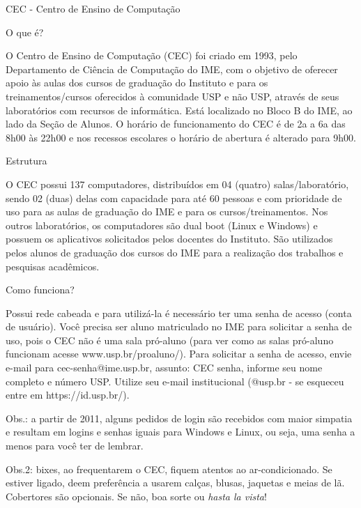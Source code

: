 \begin{secao}{CEC - Centro de Ensino de Computação}

\begin{subsecao}{O que é?}

O Centro de Ensino de Computação (CEC) foi criado em 1993, pelo
Departamento de Ciência de Computação do IME, com o objetivo de
oferecer apoio às aulas dos cursos de graduação do Instituto e para os
treinamentos/cursos oferecidos à comunidade USP e não USP, através de
seus laboratórios com recursos de informática.
Está localizado no Bloco B do IME, ao lado da Seção de Alunos. O horário
de funcionamento do CEC é de 2a a 6a das 8h00 às 22h00 e nos recessos
escolares o horário de abertura é alterado para 9h00.

\end{subsecao}

\begin{subsecao}{Estrutura}

O CEC possui 137 computadores, distribuídos em 04 (quatro)
salas/laboratório, sendo 02 (duas) delas com capacidade para até 60
pessoas e com prioridade de uso para as aulas de graduação do IME e
para os cursos/treinamentos.
Nos outros laboratórios, os computadores são dual boot (Linux e Windows) e
possuem os aplicativos solicitados pelos docentes do Instituto. São
utilizados pelos alunos de graduação dos cursos do IME para a realização
dos trabalhos e pesquisas acadêmicos.

\end{subsecao}

\begin{subsecao}{Como funciona?}

Possui rede cabeada e para utilizá-la é necessário ter uma senha de
acesso (conta de usuário). Você precisa ser aluno matriculado no IME para
solicitar a senha de uso, pois o CEC não é uma sala pró-aluno (para ver
como as salas pró-aluno funcionam acesse www.usp.br/proaluno/). 
Para solicitar a senha de acesso, envie e-mail para cec-senha@ime.usp.br,
assunto: CEC senha, informe seu nome completo e número USP. Utilize
seu e-mail institucional (@usp.br - se esqueceu entre em
https://id.usp.br/).

\end{subsecao}

Obs.: a partir de 2011, alguns pedidos de login são recebidos com maior simpatia
e resultam em logins e senhas iguais para Windows e Linux, ou seja, uma senha a
menos para você ter de lembrar.

Obs.2: bixes, ao frequentarem o CEC, fiquem atentos ao ar-condicionado. Se
estiver ligado, deem preferência a usarem calças, blusas, jaquetas e meias de
lã. Cobertores são opcionais. Se não, boa sorte ou \textit{hasta la vista}!

\end{secao}
